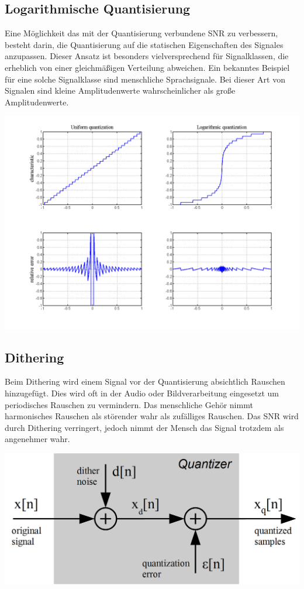 \subsection{Logarithmische Quantisierung}
Eine Möglichkeit das mit der Quantisierung verbundene SNR zu verbessern, besteht darin, die Quantisierung auf die statischen Eigenschaften des Signales anzupassen. Dieser Ansatz ist besonders vielversprechend für
Signalklassen, die erheblich von einer gleichmäßigen Verteilung abweichen. 
Ein bekanntes Beispiel für eine solche Signalklasse sind menschliche Sprachsignale. Bei dieser Art von Signalen sind kleine Amplitudenwerte wahrscheinlicher als große Amplitudenwerte.
\begin{center}
	\includegraphics[width=.9\textwidth]{../fig/quantization_compare}
\end{center}

\subsection{Dithering}
Beim Dithering wird einem Signal vor der Quantisierung absichtlich Rauschen hinzugefügt. Dies wird oft in der Audio oder Bildverarbeitung eingesetzt um periodisches Rauschen zu vermindern. Das menschliche Gehör nimmt harmonisches Rauschen als störender wahr als zufälliges Rauschen. Das SNR wird durch Dithering verringert, jedoch nimmt der Mensch das Signal trotzdem als angenehmer wahr.
\begin{center}
	\includegraphics[width=.5\textwidth]{../fig/dithering}
\end{center}